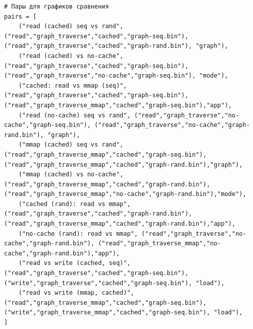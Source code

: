\documentclass[12pt,a4paper]{article}
\begin{document}
\begin{verbatim}
# Пары для графиков сравнения
pairs = [
    ("read (cached) seq vs rand", ("read","graph_traverse","cached","graph-seq.bin"), ("read","graph_traverse","cached","graph-rand.bin"), "graph"),
    ("read (cached) vs no-cache", ("read","graph_traverse","cached","graph-seq.bin"), ("read","graph_traverse","no-cache","graph-seq.bin"), "mode"),
    ("cached: read vs mmap (seq)", ("read","graph_traverse","cached","graph-seq.bin"), ("read","graph_traverse_mmap","cached","graph-seq.bin"),"app"),
    ("read (no-cache) seq vs rand", ("read","graph_traverse","no-cache","graph-seq.bin"), ("read","graph_traverse","no-cache","graph-rand.bin"), "graph"),
    ("mmap (cached) seq vs rand", ("read","graph_traverse_mmap","cached","graph-seq.bin"), ("read","graph_traverse_mmap","cached","graph-rand.bin"),"graph"),
    ("mmap (cached) vs no-cache", ("read","graph_traverse_mmap","cached","graph-rand.bin"), ("read","graph_traverse_mmap","no-cache","graph-rand.bin"),"mode"),
    ("cached (rand): read vs mmap", ("read","graph_traverse","cached","graph-rand.bin"), ("read","graph_traverse_mmap","cached","graph-rand.bin"),"app"),
    ("no-cache (rand): read vs mmap", ("read","graph_traverse","no-cache","graph-rand.bin"), ("read","graph_traverse_mmap","no-cache","graph-rand.bin"),"app"),
    ("read vs write (cached, seq)", ("read","graph_traverse","cached","graph-seq.bin"), ("write","graph_traverse","cached","graph-seq.bin"), "load"),
    ("read vs write (mmap, cached)", ("read","graph_traverse_mmap","cached","graph-seq.bin"), ("write","graph_traverse_mmap","cached","graph-seq.bin"), "load"),
]


\end{verbatim}
\end{document}
